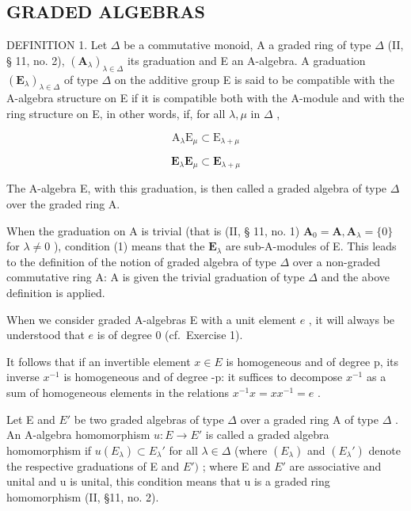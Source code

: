 \subsection{GRADED ALGEBRAS}

DEFINITION 1. Let \(\Delta\) be a commutative monoid, A a graded ring of type \(\Delta\) (II, § 11, no. 2), \((\mathbf{A}_{\lambda})_{\lambda \in \Delta}\) its graduation and E an A-algebra. A graduation \((\mathbf{E}_{\lambda})_{\lambda \in \Delta}\) of type \(\Delta\) on the additive group E is said to be compatible with the A-algebra structure on E if it is compatible both with the A-module and with the ring structure on E, in other words, if, for all \(\lambda, \mu\) in \(\Delta\) ,

\[
\mathrm{A} _ {\lambda} \mathrm{E} _ {\mu} \subset \mathrm{E} _ {\lambda + \mu}\tag{1}
\]

\[
\mathbf {E} _ {\lambda} \mathbf {E} _ {\mu} \subset \mathbf {E} _ {\lambda + \mu}\tag{2}
\]

The A-algebra E, with this graduation, is then called a graded algebra of type \(\Delta\) over the graded ring A.

When the graduation on A is trivial (that is (II, § 11, no. 1) \(\mathbf{A}_0 = \mathbf{A}, \mathbf{A}_{\lambda} = \{0\}\) for \(\lambda \neq 0\) ), condition (1) means that the \(\mathbf{E}_{\lambda}\) are sub-A-modules of E. This leads to the definition of the notion of graded algebra of type \(\Delta\) over a non-graded commutative ring A: A is given the trivial graduation of type \(\Delta\) and the above definition is applied.

When we consider graded A-algebras E with a unit element \(e\) , it will always be understood that \(e\) is of degree 0 (cf.~Exercise 1).

It follows that if an invertible element \(x \in E\) is homogeneous and of degree p, its inverse \(x^{-1}\) is homogeneous and of degree -p: it suffices to decompose \(x^{-1}\) as a sum of homogeneous elements in the relations \(x^{-1}x = xx^{-1} = e\) .

Let E and \(E'\) be two graded algebras of type \(\Delta\) over a graded ring A of type \(\Delta\) . An A-algebra homomorphism \(u: E \to E'\) is called a graded algebra homomorphism if \(u(E_{\lambda}) \subset E_{\lambda}'\) for all \(\lambda \in \Delta\) (where \((E_{\lambda})\) and \((E_{\lambda}')\) denote the respective graduations of E and \(E')\) ; where E and \(E'\) are associative and unital and u is unital, this condition means that u is a graded ring homomorphism (II, §11, no. 2).

